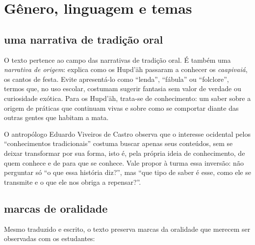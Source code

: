 \chapter{Gênero, linguagem e temas}

\vspace*{-2\baselineskip}

\section{uma narrativa de tradição oral}

O texto pertence ao campo das narrativas de tradição oral. É
também uma \textit{narrativa de origem}: explica como os Hupd'äh
passaram a conhecer os \textit{caapivaiá}, os cantos de festa. Evite
apresentá-lo como ``lenda'', ``fábula'' ou ``folclore'', termos que, no
uso escolar, costumam sugerir fantasia sem valor de verdade ou curiosidade
exótica. Para os Hupd'äh, trata-se de conhecimento: um saber sobre a
origem de práticas que continuam vivas e sobre como se comportar diante
das outras gentes que habitam a mata.

O antropólogo Eduardo Viveiros de Castro observa que o interesse
ocidental pelos ``conhecimentos tradicionais'' costuma buscar apenas seus
conteúdos, sem se deixar transformar por sua forma, isto é, pela própria
ideia de conhecimento, de quem conhece e de para que se conhece. Vale
propor à turma essa inversão: não perguntar só ``o que essa história
diz?'', mas ``que tipo de saber é esse, como ele se transmite e o que ele
nos obriga a repensar?''.

\section{marcas de oralidade}

Mesmo traduzido e escrito, o texto preserva marcas da oralidade que
merecem ser observadas com os estudantes:


